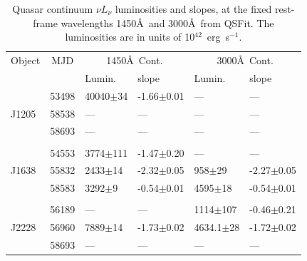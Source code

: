 \documentclass[a4paper,fleqn,usenatbib]{mnras}
\begin{document}
\begin{table}
  \begin{centering}
    \begin{tabular}{l c l l  ll}
      \hline
      \hline
        Object       &  MJD     & \multicolumn{2}{c}{1450\AA\ Cont. }     & \multicolumn{2}{c}{3000\AA\  Cont.}  \\
                         &             &  Lumin.          &  slope                              &  Lumin.  &    slope      \\
      \hline
                         & 53498   &  40040$\pm$34    & -1.66$\pm$0.01    & ---        & ---  \\
 J1205               & 58538   &   ---                     &  ---                         & ---        & ---   \\
                         & 58693   &   ---                     &  ---                         & ---        & --- \\
                         &              &                              &                                  &       & \\
                         & 54553   &  3774$\pm$111   &   -1.47$\pm$0.20    & ---                      & --- \\
 J1638              & 55832    &  2433$\pm$14     &  -2.32$\pm$0.05    & 958$\pm$29        & -2.27$\pm$0.05 \\  
                         & 58583   &  3292$\pm$9       &    -0.54$\pm$0.01  & 4595$\pm$18      &  -0.54$\pm$0.01 \\
                         &              &                              &                                 &       &     \\ 
                         & 56189    &  ---                     &  ---                         & 1114$\pm$107    & -0.46$\pm$0.21     \\
J2228                & 56960   &  7889$\pm$14     &  -1.73$\pm$0.02   &  4634.1$\pm$28  &  -1.72$\pm$0.02      \\
                         & 58693   &  ---                      &  ---                         &  ---                       &  ---  \\
      \hline
      \hline
    \end{tabular}
    \caption{Quasar continuum $\nu L_{\nu}$ luminosities and slopes, at
      the fixed rest-frame wavelengths 1450\AA\ and 3000\AA\ from QSFit.  The
      luminosities are in units of 10$^{42}$~erg~s$^{-1}$.}
    \label{tab:Baldwin}
  \end{centering}
\end{table}
\end{document}
